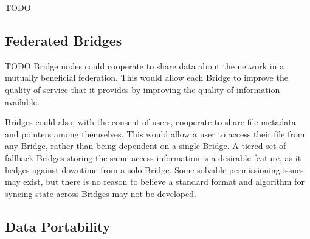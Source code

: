 \documentclass[a4paper,10pt]{article}
\newcommand{\todo}[1]{{\color{red} TODO #1}}
\begin{document}
\todo{}

\subsection{Federated Bridges}

\todo{
Bridge nodes could cooperate to share data about the network in a mutually
beneficial federation. This would allow each Bridge to improve the quality of
service that it provides by improving the quality of information available.

Bridges could also, with the consent of users, cooperate to share file metadata
and pointers among themselves. This would allow a user to access their file from
any Bridge, rather than being dependent on a single Bridge. A tiered set of
fallback Bridges storing the same access information is a desirable feature, as
it hedges against downtime from a solo Bridge. Some solvable permissioning
issues may exist, but there is no reason to believe a standard format and
algorithm for syncing state across Bridges may not be developed.
}

\subsection{Data Portability}
\end{document}
